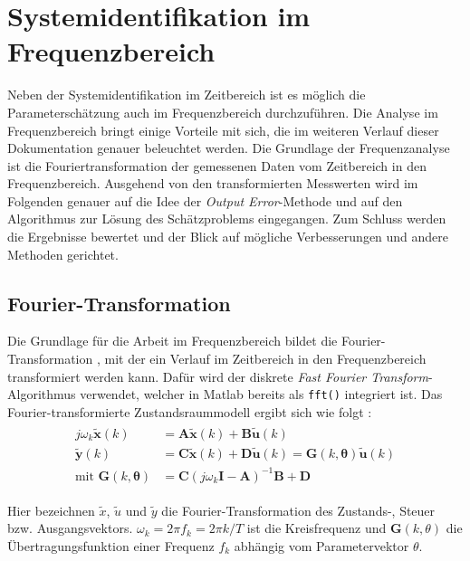 \chapter{Systemidentifikation im Frequenzbereich}

Neben der Systemidentifikation im Zeitbereich ist es möglich die Parameterschätzung auch im Frequenzbereich durchzuführen. 
Die Analyse im Frequenzbereich bringt einige Vorteile mit sich, die im weiteren Verlauf dieser Dokumentation genauer 
beleuchtet werden. Die Grundlage der Frequenzanalyse ist die Fouriertransformation der gemessenen Daten vom Zeitbereich in 
den Frequenzbereich. Ausgehend von den transformierten Messwerten wird im Folgenden genauer auf die Idee der 
\textit{Output Error}-Methode und auf den Algorithmus zur Lösung des Schätzproblems eingegangen. Zum Schluss werden die 
Ergebnisse 
bewertet und der Blick auf mögliche Verbesserungen und andere Methoden gerichtet.


\section{Fourier-Transformation}  

Die Grundlage für die Arbeit im Frequenzbereich bildet die Fourier-Transformation \cite{Bendat1986}, mit der ein Verlauf im 
Zeitbereich in den Frequenzbereich transformiert werden kann. Dafür wird der diskrete \textit{Fast Fourier 
Transform}-Algorithmus verwendet, welcher in Matlab bereits als \texttt{fft()} integriert ist. Das Fourier-transformierte 
Zustandsraummodell ergibt sich wie folgt \cite{Klein2006}:
\begin{align}
	\begin{split}
		j\omega_{k}\mathbf{\tilde{x}}(k)  &= \mathbf{A\tilde{x}}(k) + \mathbf{B\tilde{u}}(k)  \\
		\mathbf{\tilde{y}}(k)             &= \mathbf{C\tilde{x}}(k) + \mathbf{D\tilde{u}}(k) = 
		\mathbf{G}(k,\mathbf{\theta})\mathbf{\tilde{u}}(k)  \\
		\text{mit }\mathbf{G}(k,\mathbf{\theta}) &= \mathbf{C}(j\omega_k\mathbf{I}-\mathbf{A})^{-1}\mathbf{B}+\mathbf{D}
		\label{eq:ZRD_Frequenzbereich}
	\end{split}
\end{align}

Hier bezeichnen $ \tilde{x} $, $ \tilde{u} $ und $ \tilde{y} $ die Fourier-Transformation des Zustands-, Steuer bzw. 
Ausgangsvektors. $ \omega_k=2\pi f_k=2\pi k/T $ ist die Kreisfrequenz und $ \mathbf{G}(k,\theta) $ die Übertragungsfunktion 
einer Frequenz $ f_k $ abhängig vom Parametervektor $ \theta $.


